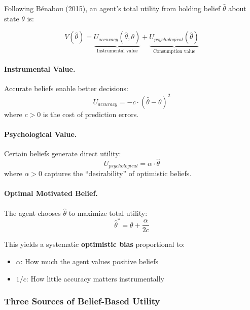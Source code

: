 Following Bénabou (2015), an agent's total utility from holding belief 
$\hat{\theta}$ about state $\theta$ is:

\begin{equation}
\label{eq:belief-utility}
V(\hat{\theta}) = \underbrace{U_{accuracy}(\hat{\theta}, \theta)}_{\text{Instrumental value}} + \underbrace{U_{psychological}(\hat{\theta})}_{\text{Consumption value}}
\end{equation}

\paragraph{Instrumental Value.}
Accurate beliefs enable better decisions:
\begin{equation}
U_{accuracy} = -c \cdot (\hat{\theta} - \theta)^2
\end{equation}
where $c > 0$ is the cost of prediction errors.

\paragraph{Psychological Value.}
Certain beliefs generate direct utility:
\begin{equation}
U_{psychological} = \alpha \cdot \hat{\theta}
\end{equation}
where $\alpha > 0$ captures the ``desirability'' of optimistic beliefs.

\paragraph{Optimal Motivated Belief.}
The agent chooses $\hat{\theta}$ to maximize total utility:
\begin{equation}
\hat{\theta}^* = \theta + \frac{\alpha}{2c}
\end{equation}

This yields a systematic \textbf{optimistic bias} proportional to:
\begin{itemize}
\item $\alpha$: How much the agent values positive beliefs
\item $1/c$: How little accuracy matters instrumentally
\end{itemize}

\subsubsection{Three Sources of Belief-Based Utility}
\label{subsubsec:three-sources}

